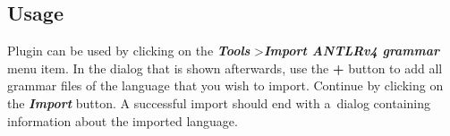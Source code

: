 \subsection{Usage}

Plugin can be used by clicking on the \textbf{\textit{Tools}} \textgreater \textbf{\textit{Import ANTLRv4 grammar}} menu item.
In the dialog that is shown afterwards, use the \textbf{+} button to add all grammar files of the language that you wish to import.
Continue by clicking on the \textbf{\textit{Import}} button.
A successful import should end with a~dialog containing information about the imported language.

